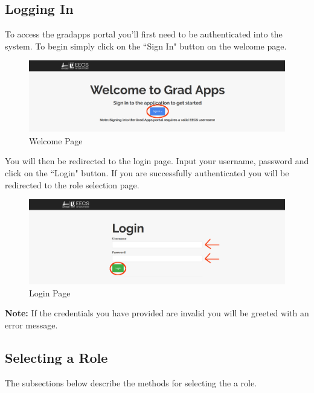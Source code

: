 \documentclass[fontsize=12pt,paper=letter,twoside]{scrartcl}
\begin{document}
\subsection{Logging In}

To access the gradapps portal you'll first need to be authenticated into the system. To begin simply click on the ``Sign In" button on the welcome page.

\begin{figure}[!htb]
\begin{center}
\includegraphics[width=.99\textwidth]{images/welcome.png}
\end{center}
\caption{Welcome Page}
\label{fig:welcome}
\end{figure}

\bigskip
\noindent You will then be redirected to the login page. Input your username, password and click on the ``Login" button. If you are successfully authenticated you will be redirected to the role selection page.

\clearpage
\begin{figure}[!htb]
\begin{center}
\includegraphics[width=.99\textwidth]{images/login.png}
\end{center}
\caption{Login Page}
\label{fig:login}
\end{figure}

\bigskip
\noindent \textbf{Note:} If the credentials you have provided are invalid you will be greeted with an error message.

\subsection{Selecting a Role}
The subsections below describe the methods for selecting the a role.
\end{document}
